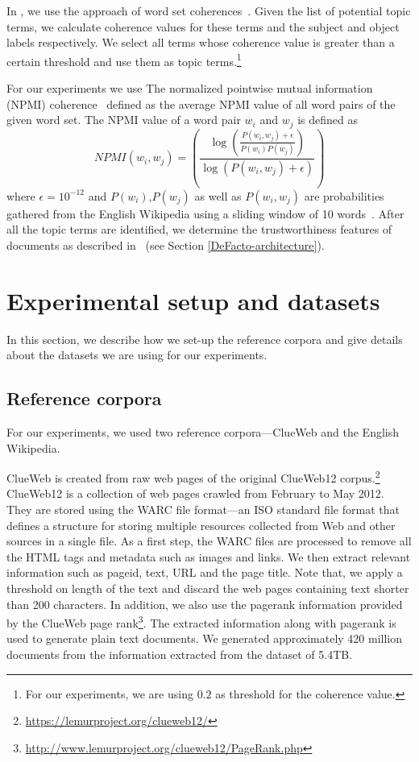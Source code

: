 In \FactCheck, we use the approach of word set coherences~\cite{roder2015exploring}. Given the list of potential topic terms, we calculate coherence values for these terms and the subject and object labels respectively. We select all terms whose coherence value is greater than a certain threshold and use them as topic terms.\footnote{For our experiments, we are using $0.2$ as threshold for the coherence value.}

For our experiments we use The normalized pointwise mutual information (NPMI) coherence~\cite{aletras2013evaluating} defined as the average NPMI value of all word pairs of the given word set. The NPMI value of a word pair $w_i$ and $w_j$ is defined as
\begin{equation}
NPMI(w_i, w_j)=\left(\frac{\log\left(\frac{P(w_i,w_j) + \epsilon}{P(w_i)P(w_j)}\right)}{\log \left(P(w_i,w_j) + \epsilon\right)} \right)
\end{equation}
where $\epsilon=10^{-12}$ and $P(w_i)$,$P(w_j)$ as well as $P(w_i,w_j)$ are probabilities gathered from the English Wikipedia using a sliding window of 10 words~\cite{roder2015exploring}. After all the topic terms are identified, we determine the trustworthiness features of documents as described in \DeFacto\ (see Section \ref{DeFacto-architecture}).

\section{Experimental setup and datasets}
\label{sec:expSetup}
In this section, we describe how we set-up the reference corpora and give details about the datasets we are using for our experiments.

\subsection{Reference corpora}

For our experiments, we used two reference corpora---ClueWeb and the English Wikipedia.

ClueWeb is created from raw web pages of the original ClueWeb12 corpus.\footnote{\url{https://lemurproject.org/clueweb12/}} Clue\-Web12 is a collection of web pages crawled from February to May 2012. They are stored using the WARC file format---an ISO standard file format that defines a structure for storing multiple resources collected from Web and other sources in a single file. As a first step, the WARC files are processed to remove all the HTML tags and metadata such as images and links. We then extract relevant information such as pageid, text, URL and the page title. Note that, we apply a threshold on length of the text and discard the web pages containing text shorter than 200 characters. In addition, we also use the pagerank information provided by the ClueWeb page rank\footnote{\url{http://www.lemurproject.org/clueweb12/PageRank.php}}. The extracted information along with pagerank is used to generate plain text documents. We generated approximately 420 million documents from the information extracted from the dataset of 5.4TB.

